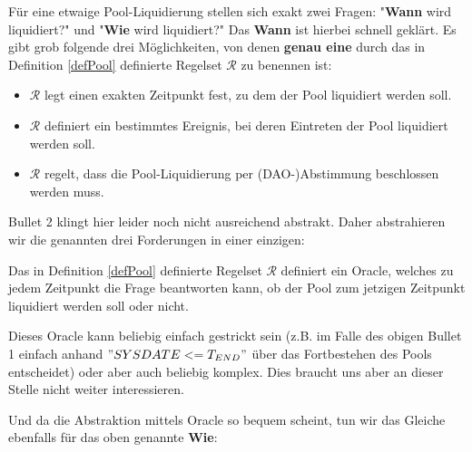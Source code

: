 
Für eine etwaige Pool-Liquidierung stellen sich exakt zwei Fragen: "\textbf{Wann} wird liquidiert?" und "\textbf{Wie} wird liquidiert?" Das \textbf{Wann} ist hierbei schnell geklärt. Es gibt grob folgende drei Möglichkeiten, von denen \textbf{genau eine} durch das in Definition \ref{defPool} definierte Regelset $\mathcal{R}$ zu benennen ist:

\begin{itemize}
  \item $\mathcal{R}$ legt einen exakten Zeitpunkt fest, zu dem der Pool liquidiert werden soll.
  \item $\mathcal{R}$ definiert ein bestimmtes Ereignis, bei deren Eintreten der Pool liquidiert werden soll.
  \item $\mathcal{R}$ regelt, dass die Pool-Liquidierung per (DAO-)Abstimmung beschlossen werden muss.
\end{itemize}

\vspace{0.3cm}

Bullet 2 klingt hier leider noch nicht ausreichend abstrakt. Daher abstrahieren wir die genannten drei Forderungen in einer einzigen:

\vspace{0.2cm}

\begin{Def}
\label{defLiquiOracle}

Das in Definition \ref{defPool} definierte Regelset $\mathcal{R}$ definiert ein Oracle, welches zu jedem Zeitpunkt die Frage beantworten kann, ob der Pool zum jetzigen Zeitpunkt liquidiert werden soll oder nicht. 

\end{Def}
 
\vspace{0.1cm}
 
Dieses Oracle kann beliebig einfach gestrickt sein (z.B. im Falle des obigen Bullet 1 einfach anhand $"SYSDATE <= T_{END}"$ über das Fortbestehen des Pools entscheidet) oder aber auch beliebig komplex. Dies braucht uns aber an dieser Stelle nicht weiter interessieren.

\vspace{0.3cm}

Und da die Abstraktion mittels Oracle so bequem scheint, tun wir das Gleiche ebenfalls für das oben genannte \textbf{Wie}:

\vspace{0.2cm}

